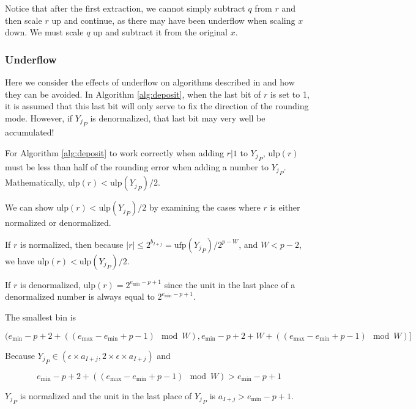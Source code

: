 \documentclass[12pt]{article}
\providecommand{\min}{\ensuremath{\text{min}}}
\providecommand{\max}{\ensuremath{\text{max}}}
\providecommand{\ulp}{\ensuremath{\text{ulp}}}
\providecommand{\ufp}{\ensuremath{\text{ufp}}}
\theoremstyle{plain}
\begin{document}
      Notice that after the first extraction, we cannot simply subtract $q$ from $r$ and then scale $r$ up and continue, as there may have been underflow when scaling $x$ down. We must scale $q$ up and subtract it from the original $x$.

    \subsubsection{Underflow}
      \label{sec:underflow}
      Here we consider the effects of underflow on algorithms described in \cite{repsum} and how they can be avoided. In Algorithm \ref{alg:deposit}, when the last bit of $r$ is set to 1, it is assumed that this last bit will only serve to fix the direction of the rounding mode. However, if ${Y_j}_P$ is denormalized, that last bit may very well be accumulated!

      For Algorithm \ref{alg:deposit} to work correctly when adding $r | 1$ to ${Y_j}_P$, $\ulp(r)$ must be less than half of the rounding error when adding a number to ${Y_j}_P$. Mathematically, $\ulp(r) < \ulp({Y_j}_P)/2$.

      We can show $\ulp(r) < \ulp({Y_j}_P)/2$ by examining the cases where $r$ is either normalized or denormalized.

      If $r$ is normalized, then because $|r| \leq 2^{b_{I + j}} = \ufp({Y_j}_P)/2^{p - W}$, and $W < p - 2$, we have $\ulp(r) < \ulp({Y_j}_P)/2$.

      If $r$ is denormalized, $\ulp(r) = 2^{e_{\min} - p + 1}$ since the unit in the last place of a denormalized number is always equal to $2^{e_{\min} - p + 1}$.

      The smallest bin is

      \begin{equation*}
      (e_{\min} - p + 2 + ((e_{\max} - e_{\min} + p - 1 ) \mod W), e_{\min} - p + 2 + W + ((e_{\max} - e_{\min} + p - 1)\mod W)]
      \end{equation*}

      Because ${Y_j}_P \in (\epsilon \times a_{I + j}, 2 \times \epsilon \times a_{I + j})$ and

      \begin{equation*}
      e_{\min} - p + 2 + ((e_{\max} - e_{\min} + p- 1) \mod W) > e_{\min} - p + 1
      \end{equation*}

      ${Y_j}_P$ is normalized and the unit in the last place of ${Y_j}_P$ is $a_{I + j} > e_{\min} - p + 1$.
\end{document}
